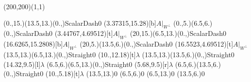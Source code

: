 \unitlength=1bp%

\begin{feynartspicture}(200,200)(1,1)

\FADiagram{}
\FAProp(0.,15.)(13.5,13.)(0.,){ScalarDash}{0}
\FALabel(3.37315,15.28)[b]{$A|_{W^\perp}$}
\FAProp(0.,5.)(6.5,6.)(0.,){ScalarDash}{0}
\FALabel(3.44767,4.69512)[t]{$A|_{W^\perp}$}
\FAProp(20,15.)(6.5,13.)(0.,){ScalarDash}{0}
\FALabel(16.6265,15.2808)[b]{$A|_{W^\perp}$}
\FAProp(20,5.)(13.5,6.)(0.,){ScalarDash}{0}
\FALabel(16.5523,4.69512)[t]{$A|_{W^\perp}$}
\FAProp(13.5,13.)(6.5,13.)(0.,){Straight}{0}
\FALabel(10.,12.18)[t]{$\lambda$}
\FAProp(13.5,13.)(13.5,6.)(0.,){Straight}{0}
\FALabel(14.32,9.5)[l]{$\lambda$}
\FAProp(6.5,6.)(6.5,13.)(0.,){Straight}{0}
\FALabel(5.68,9.5)[r]{$\lambda$}
\FAProp(6.5,6.)(13.5,6.)(0.,){Straight}{0}
\FALabel(10.,5.18)[t]{$\lambda$}
\FAVert(13.5,13.){0}
\FAVert(6.5,6.){0}
\FAVert(6.5,13.){0}
\FAVert(13.5,6.){0}
\end{feynartspicture}

